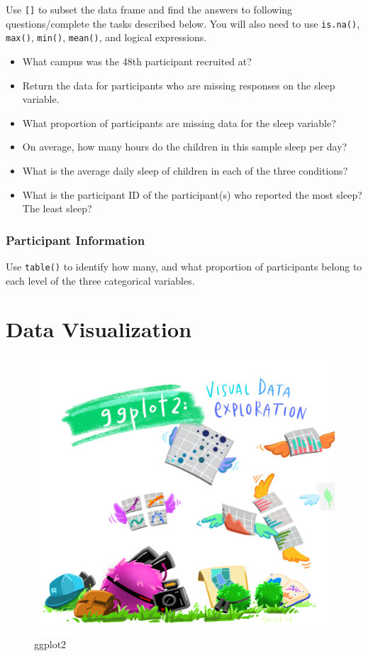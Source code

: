 \documentclass[
]{book}
\providecommand{\tightlist}{%
  \setlength{\itemsep}{0pt}\setlength{\parskip}{0pt}}
\begin{document}
Use \texttt{{[}{]}} to subset the data frame and find the answers to following questions/complete the tasks described below. You will also need to use \texttt{is.na()}, \texttt{max()}, \texttt{min()}, \texttt{mean()}, and logical expressions.

\begin{itemize}
\tightlist
\item
  What campus was the 48th participant recruited at?
\item
  Return the data for participants who are missing responses on the sleep variable.
\item
  What proportion of participants are missing data for the sleep variable?
\item
  On average, how many hours do the children in this sample sleep per day?
\item
  What is the average daily sleep of children in each of the three conditions?
\item
  What is the participant ID of the participant(s) who reported the most sleep? The least sleep?
\end{itemize}

\hypertarget{participant-information}{%
\subsection{Participant Information}\label{participant-information}}

Use \texttt{table()} to identify how many, and what proportion of participants belong to each level of the three categorical variables.

\hypertarget{data-viz}{%
\chapter{Data Visualization}\label{data-viz}}

\begin{figure}
\centering
\includegraphics{img/ggplot2_exploratory.png}
\caption{ggplot2}
\end{figure}
\end{document}
